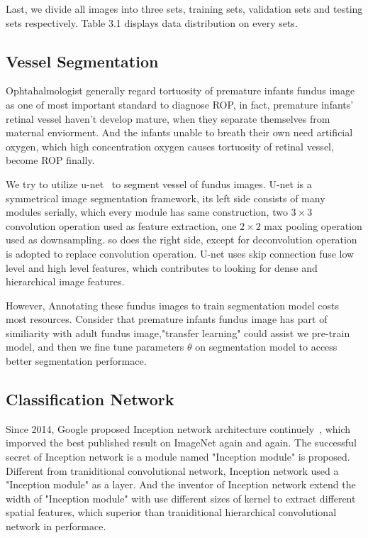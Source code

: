 \documentclass[10pt,twocolumn,letterpaper]{article}
\begin{document}
  Last, we divide all images into three sets, training sets, validation sets and testing sets respectively. Table 3.1 displays data distribution on every sets.

\subsection{Vessel Segmentation}
  Ophtahalmologist generally regard tortuosity of premature infants fundus image as one of most important standard to diagnose ROP, in fact, premature infants' retinal vessel haven't develop mature, when they separate themselves from maternal enviorment. And the infants unable to breath their own need artificial oxygen, which high concentration oxygen causes tortuosity of retinal vessel, become ROP finally.

  We try to utilize u-net~\cite{02} to segment vessel of fundus images. U-net is a symmetrical image segmentation framework, its left side consists of many modules serially, which every module has same construction, two $3\times3$ convolution operation used as feature extraction, one $2\times2$ max pooling operation used as downsampling. so does the right side, except for deconvolution operation is adopted to replace convolution operation. U-net uses skip connection fuse low level and high level features, which contributes to looking for dense and hierarchical image features.

  However, Annotating these fundus images to train segmentation model costs most resources.
  Consider that premature infants fundus image has part of similiarity with adult fundus image,"transfer learning" could assist we pre-train model, and then we fine tune parameters $\theta$ on segmentation model to access better segmentation performace.

\subsection{Classification Network}
  Since 2014, Google proposed Inception network architecture continuely~\cite{03, 04, 05, 06}, which imporved the best published result on ImageNet again and again. The successful secret of Inception network is a module named "Inception module" is proposed. Different from traniditional convolutional network, Inception network used a "Inception module"  as a layer. And the inventor of Inception network extend the width of "Inception module" with use different sizes of kernel to extract different spatial features, which superior than traniditional hierarchical convolutional network in performace.
\end{document}
